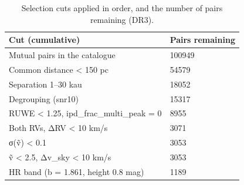 \begin{table}
\caption{Selection cuts applied in order, and the number of pairs remaining (DR3).}
\begin{tabular}{ll}
\toprule
Cut (cumulative) & Pairs remaining \\
\midrule
Mutual pairs in the catalogue & 100949 \\
Common distance < 150 pc & 54579 \\
Separation 1–30 kau & 18052 \\
Degrouping (snr10) & 15317 \\
RUWE < 1.25, ipd\_frac\_multi\_peak = 0 & 8955 \\
Both RVs, ΔRV < 10 km/s & 3071 \\
σ(ṽ) < 0.1 & 3053 \\
ṽ < 2.5, Δv\_sky < 10 km/s & 3053 \\
HR band (b = 1.861, height 0.8 mag) & 1189 \\
\bottomrule
\end{tabular}
\end{table}
